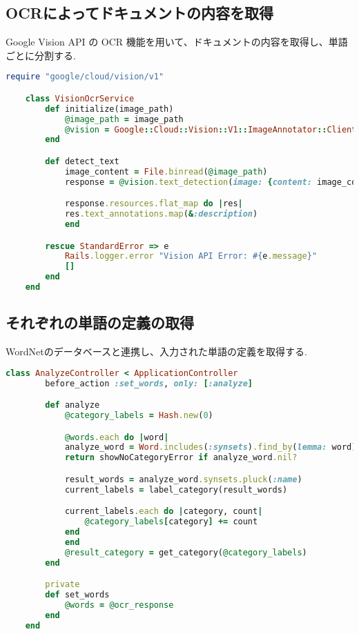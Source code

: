 \subsection{OCRによってドキュメントの内容を取得}
\label{subsec:app_ocr}

Google Vision API の OCR 機能を用いて、ドキュメントの内容を取得し、単語ごとに分割する.
\clearpage
\begin{lstlisting}[language=Ruby, caption=Ruby による OCR の実装]
    require "google/cloud/vision/v1"

    class VisionOcrService
        def initialize(image_path)
            @image_path = image_path
            @vision = Google::Cloud::Vision::V1::ImageAnnotator::Client.new
        end

        def detect_text
            image_content = File.binread(@image_path)
            response = @vision.text_detection(image: {content: image_content})

            response.resources.flat_map do |res|
            res.text_annotations.map(&:description)
            end

        rescue StandardError => e
            Rails.logger.error "Vision API Error: #{e.message}"
            []
        end
    end
\end{lstlisting}

\subsection{それぞれの単語の定義の取得}
\label{sebsec:app_synset}

WordNetのデータベースと連携し、入力された単語の定義を取得する.
\clearpage
\begin{lstlisting}[language=Ruby, caption=ActiveRecord による WordNet との連携]
    class AnalyzeController < ApplicationController
        before_action :set_words, only: [:analyze]

        def analyze
            @category_labels = Hash.new(0)

            @words.each do |word|
            analyze_word = Word.includes(:synsets).find_by(lemma: word)
            return showNoCategoryError if analyze_word.nil?

            result_words = analyze_word.synsets.pluck(:name)
            current_labels = label_category(result_words)

            current_labels.each do |category, count|
                @category_labels[category] += count
            end
            end
            @result_category = get_category(@category_labels)
        end

        private
        def set_words
            @words = @ocr_response
        end
    end
\end{lstlisting}

